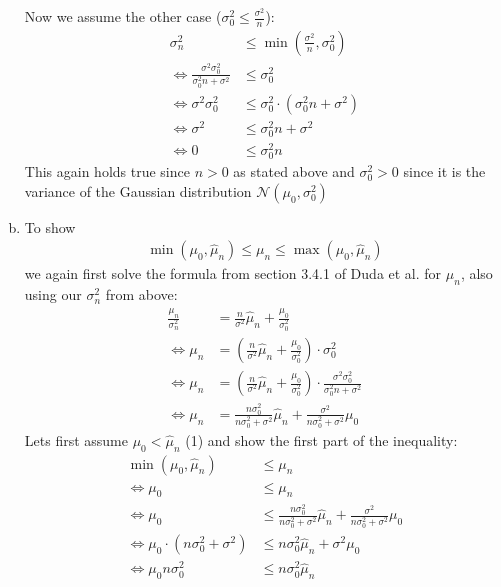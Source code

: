 \documentclass[10pt,a4paper]{article}
\begin{document}
\begin{enumerate}[(a)]
Now we assume the other case ($\sigma_{0}^2 \le \frac{\sigma^2}{n}$):
\begin{align*}
    \sigma_{n}^2 &\le \min{(\frac{\sigma^2}{n},\sigma_{0}^2)} \\
    \Leftrightarrow \frac{\sigma^2\sigma_{0}^2}{\sigma_{0}^2n+\sigma^2} &\le \sigma_{0}^2\\
    \Leftrightarrow \sigma^2\sigma_{0}^2 &\le \sigma_{0}^2 \cdot (\sigma_{0}^2n+\sigma^2)\\
    \Leftrightarrow \sigma^2 &\le \sigma_{0}^2n+\sigma^2\\
    \Leftrightarrow 0 &\le \sigma_{0}^2n
\end{align*}
This again holds true since $n > 0$ as stated above and $\sigma_{0}^2 > 0$ since it is the variance of the Gaussian distribution $\mathcal{N}(\mu_0,\sigma_{0}^2)$
\item
To show
\begin{align*}
    \min{(\mu_0,\hat{\mu}_n)} \le \mu_n \le \max{(\mu_0,\hat{\mu}_n)}
\end{align*}
we again first solve the formula from section 3.4.1 of Duda et al. for $\mu_n$, also using our $\sigma_{n}^2$ from above:
\begin{align*}
    \frac{\mu_n}{\sigma_{n}^2} &= \frac{n}{\sigma^2}\hat{\mu}_n+\frac{\mu_0}{\sigma_{0}^2}\\
    \Leftrightarrow \mu_n &= (\frac{n}{\sigma^2}\hat{\mu}_n+\frac{\mu_0}{\sigma_{0}^2}) \cdot \sigma_{0}^2\\
    \Leftrightarrow \mu_n &= (\frac{n}{\sigma^2}\hat{\mu}_n+\frac{\mu_0}{\sigma_{0}^2}) \cdot \frac{\sigma^2\sigma_{0}^2}{\sigma_{0}^2n+\sigma^2}\\
    \Leftrightarrow \mu_n &= \frac{n\sigma_{0}^2}{n\sigma_{0}^2+\sigma^2}\hat{\mu}_n+\frac{\sigma^2}{n\sigma_{0}^2+\sigma^2}\mu_0
\end{align*}
Lets first assume $\mu_0 < \hat{\mu}_n$ (1) and show the first part of the inequality:
\begin{align*}
    \min{(\mu_0,\hat{\mu}_n)} &\le \mu_n \\
    \Leftrightarrow \mu_0 &\le \mu_n\\
    \Leftrightarrow \mu_0 &\le \frac{n\sigma_{0}^2}{n\sigma_{0}^2+\sigma^2}\hat{\mu}_n+\frac{\sigma^2}{n\sigma_{0}^2+\sigma^2}\mu_0\\
    \Leftrightarrow \mu_0 \cdot (n\sigma_{0}^2+\sigma^2) &\le n\sigma_{0}^2\hat{\mu}_n + \sigma^2\mu_0\\
    \Leftrightarrow \mu_0 n\sigma_{0}^2 &\le n\sigma_{0}^2\hat{\mu}_n\\

\end{align*}
\end{enumerate}
\end{document}
